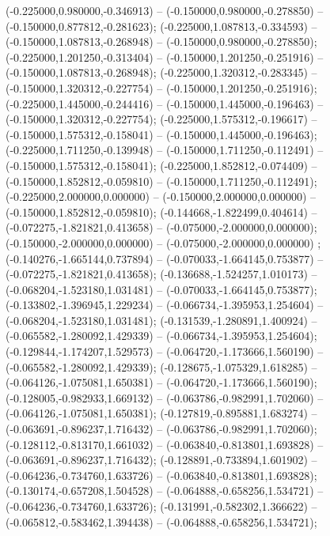  (-0.225000,0.980000,-0.346913) -- (-0.150000,0.980000,-0.278850) -- (-0.150000,0.877812,-0.281623);
 (-0.225000,1.087813,-0.334593) -- (-0.150000,1.087813,-0.268948) -- (-0.150000,0.980000,-0.278850);
 (-0.225000,1.201250,-0.313404) -- (-0.150000,1.201250,-0.251916) -- (-0.150000,1.087813,-0.268948);
 (-0.225000,1.320312,-0.283345) -- (-0.150000,1.320312,-0.227754) -- (-0.150000,1.201250,-0.251916);
 (-0.225000,1.445000,-0.244416) -- (-0.150000,1.445000,-0.196463) -- (-0.150000,1.320312,-0.227754);
 (-0.225000,1.575312,-0.196617) -- (-0.150000,1.575312,-0.158041) -- (-0.150000,1.445000,-0.196463);
 (-0.225000,1.711250,-0.139948) -- (-0.150000,1.711250,-0.112491) -- (-0.150000,1.575312,-0.158041);
 (-0.225000,1.852812,-0.074409) -- (-0.150000,1.852812,-0.059810) -- (-0.150000,1.711250,-0.112491);
 (-0.225000,2.000000,0.000000) -- (-0.150000,2.000000,0.000000) -- (-0.150000,1.852812,-0.059810);
 (-0.144668,-1.822499,0.404614) -- (-0.072275,-1.821821,0.413658) -- (-0.075000,-2.000000,0.000000);
 (-0.150000,-2.000000,0.000000) -- (-0.075000,-2.000000,0.000000) ;
 (-0.140276,-1.665144,0.737894) -- (-0.070033,-1.664145,0.753877) -- (-0.072275,-1.821821,0.413658);
 (-0.136688,-1.524257,1.010173) -- (-0.068204,-1.523180,1.031481) -- (-0.070033,-1.664145,0.753877);
 (-0.133802,-1.396945,1.229234) -- (-0.066734,-1.395953,1.254604) -- (-0.068204,-1.523180,1.031481);
 (-0.131539,-1.280891,1.400924) -- (-0.065582,-1.280092,1.429339) -- (-0.066734,-1.395953,1.254604);
 (-0.129844,-1.174207,1.529573) -- (-0.064720,-1.173666,1.560190) -- (-0.065582,-1.280092,1.429339);
 (-0.128675,-1.075329,1.618285) -- (-0.064126,-1.075081,1.650381) -- (-0.064720,-1.173666,1.560190);
 (-0.128005,-0.982933,1.669132) -- (-0.063786,-0.982991,1.702060) -- (-0.064126,-1.075081,1.650381);
 (-0.127819,-0.895881,1.683274) -- (-0.063691,-0.896237,1.716432) -- (-0.063786,-0.982991,1.702060);
 (-0.128112,-0.813170,1.661032) -- (-0.063840,-0.813801,1.693828) -- (-0.063691,-0.896237,1.716432);
 (-0.128891,-0.733894,1.601902) -- (-0.064236,-0.734760,1.633726) -- (-0.063840,-0.813801,1.693828);
 (-0.130174,-0.657208,1.504528) -- (-0.064888,-0.658256,1.534721) -- (-0.064236,-0.734760,1.633726);
 (-0.131991,-0.582302,1.366622) -- (-0.065812,-0.583462,1.394438) -- (-0.064888,-0.658256,1.534721);
